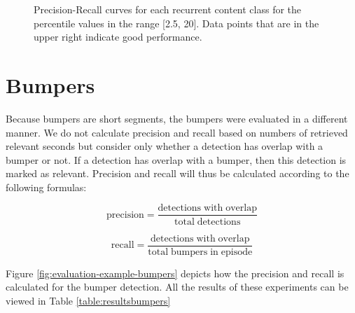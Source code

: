 \documentclass{report}
\begin{document}
\begin{figure}[h]
	\centering
	\caption{Precision-Recall curves for each recurrent content class for the percentile values in the range [2.5, 20]. Data points that are in the upper right indicate good performance.}
	\label{fig:precision-recall}
\end{figure}

\section{Bumpers}
Because bumpers are short segments, the bumpers were evaluated in a different manner. We do not calculate precision and recall based on numbers of retrieved relevant seconds but consider only whether a detection has overlap with a bumper or not. If a detection has overlap with a bumper, then this detection is marked as relevant. Precision and recall will thus be calculated according to the following formulas:

\[\mathrm{precision} = \frac{\mathrm{detections\;with\;overlap}}{\mathrm{total\;detections}}\]

\[\mathrm{recall} = \frac{\mathrm{detections\;with\;overlap}}{\mathrm{total\;bumpers\;in\;episode}}\]

Figure \ref{fig:evaluation-example-bumpers} depicts how the precision and recall is calculated for the bumper detection. All the results of these experiments can be viewed in Table \ref{table:resultsbumpers}
\end{document}
